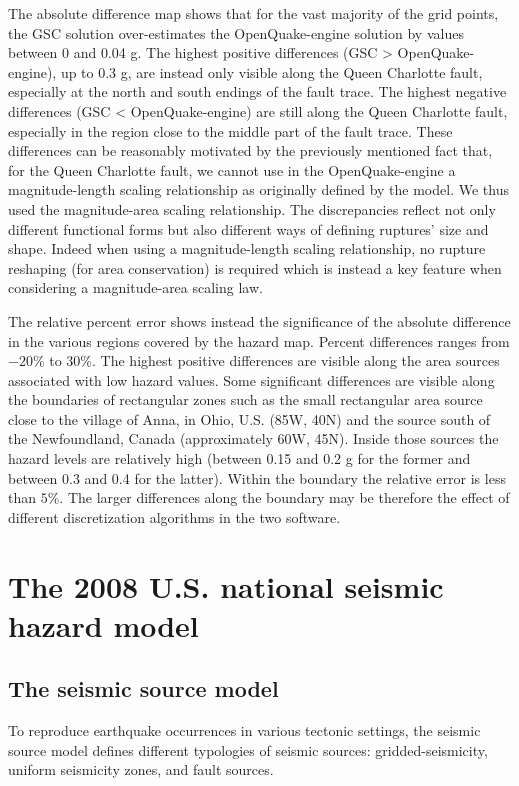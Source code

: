 The absolute difference map shows that for the vast majority of the grid points, the GSC solution over-estimates the OpenQuake-engine solution by values between 0 and 0.04 g. The highest positive differences (GSC > OpenQuake-engine), up to 0.3 g, are instead only visible along the Queen Charlotte fault, especially at the north and south endings of the fault trace. The highest negative differences (GSC < OpenQuake-engine) are still along the Queen Charlotte fault, especially in the region close to the middle part of the fault trace. These differences can be reasonably motivated by the previously mentioned fact that, for the Queen Charlotte fault, we cannot use in the OpenQuake-engine a magnitude-length scaling relationship as originally defined by the model. We thus used the \citet{wells1994} magnitude-area scaling relationship. The discrepancies reflect not only different functional forms but also different ways of defining ruptures' size and shape. Indeed when using a magnitude-length scaling relationship, no rupture reshaping (for area conservation) is required which is instead a key feature when considering a magnitude-area scaling law.

The relative percent error shows instead the significance of the absolute difference in the various regions covered by the hazard map. Percent differences ranges from $-20\%$ to $30\%$. The highest positive differences are visible along the area sources associated with low hazard values. Some significant differences are visible along the boundaries of rectangular zones such as the small rectangular area source close to the village of Anna, in Ohio, U.S. (85W, 40N) and the source south of the Newfoundland, Canada (approximately 60W, 45N). Inside those sources the hazard levels are relatively high (between 0.15 and 0.2 g for the former and between 0.3 and 0.4 for the latter). Within the boundary the relative error is less than $5\%$. The larger differences along the boundary may be therefore the effect of different discretization algorithms in the two software.


\section{The 2008 U.S. national seismic hazard model}

\subsection{The seismic source model}
To reproduce earthquake occurrences in various tectonic settings, the seismic source model defines different typologies of seismic sources: gridded-seismicity, uniform seismicity zones, and fault sources.


